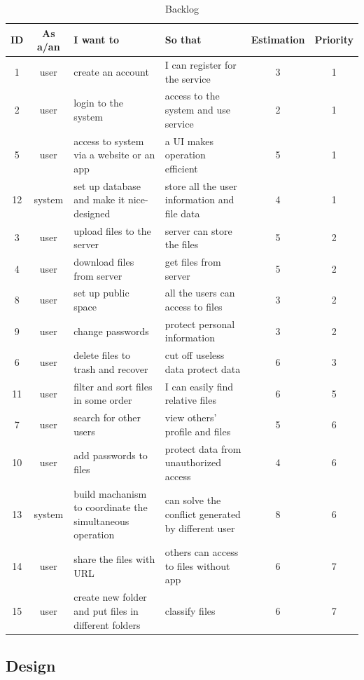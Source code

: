 \documentclass[a4paper,11pt]{article}
\begin{document}
\begin{table}[H]
\centering
\begin{tabular}{|c|c|p{4cm}|p{4cm}|c|c|}
\hline
ID & As a/an & I want to & So that & Estimation & Priority
\\
\hline
1 & user & create an account & I can register for the  service & 3 & 1
\\
\hline
2 & user & login to the system & access to the system and use service & 2 & 1
\\
\hline
5 & user & access to system via a website or an app & a UI makes operation efficient & 5 & 1
\\
\hline
12 & system & set up database and make it nice-designed & store all the user information and file data & 4 & 1
\\
\hline
3 & user & upload files to the server & server can store the files & 5 & 2
\\
\hline
4 & user & download files from server & get files from server & 5 & 2
\\
\hline
8 & user & set up public  space & all the users can access to files & 3 & 2
\\
\hline
9 & user & change  passwords & protect personal information & 3 & 2
\\
\hline
6 & user & delete files to trash and  recover & cut off useless data protect data & 6 & 3
\\
\hline
11 & user & filter and sort files in some order & I can easily find relative files & 6 & 5
\\
\hline
7 & user & search for other users & view  others' profile and files & 5 & 6
\\
\hline
10 & user & add passwords to files & protect data from unauthorized access & 4 & 6
\\
\hline
13 & system & build machanism to  coordinate the simultaneous operation & can solve the conflict generated by different user & 8 & 6
\\
\hline
14 & user & share the files with URL & others can access to files without app & 6 & 7
\\
\hline
15 & user & create new folder and put files in different folders & classify files & 6 & 7
\\
\hline
\end{tabular}
\caption{Backlog}
\end{table}
\subsection{Design}
\end{document}
